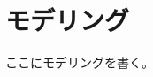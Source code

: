 \documentclass[12pt,a4paper,oneside,onecolumn,fleqn,dvipdfmx]{jreport}
\begin{document}
    \chapter{モデリング}
        ここにモデリングを書く。
\end{document}
